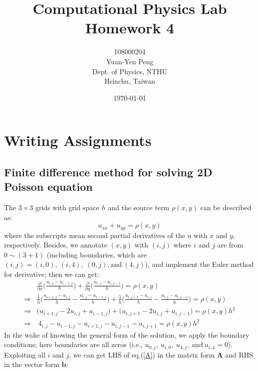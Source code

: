 \documentclass[12pt]{article}
\begin{document}
\title{\textbf{{\normalsize Computational Physics Lab}\\
                Homework 4}}
\author{108000204\\
        Yuan-Yen Peng\\
        Dept. of Physics, NTHU\\
        Hsinchu, Taiwan}
\date{\today}
\maketitle

\section{Writing Assignments}
    \subsection{Finite difference method for solving 2D Poisson equation}
    The $3 \times 3$ grids with grid space $h$ and the source term $\rho(x,y)$ can be described as:
    \[
        u_{xx} + u_{yy} = \rho(x,y)
    \]
    where the subscripts mean second partial derivatives of the u with $x$ and $y$, respectively. Besides, we annotate $(x,y)$ with $(i,j)$ where $i$ and $j$ are from $0 \sim (3+1)$ (including boundaries, which are $(i,j) = (i,0),\ (i,4),\ (0,j),\text{and}\ (4,j)$), and implement the Euler method for derivative; then we can get:
    \begin{align*}
        &\frac{\partial}{\partial x}\Big( \frac{u_{i,j} - u_{i-1,j}}{h} \Big) + \frac{\partial}{\partial y}\Big( \frac{u_{i,j} - u_{i,j-1}}{h} \Big) = \rho(x,y) \\
        \Rightarrow &\frac{1}{h} \Big( \frac{u_{i+1,j} - u_{i,j}}{h} - \frac{u_{i,j} - u_{i-1,j}}{h} \Big) + \frac{1}{h} \Big( \frac{u_{i,j+1} - u_{i,j}}{h} - \frac{u_{i,j} - u_{i,j-1}}{h} \Big) = \rho(x,y) \\
        \Rightarrow &\big( u_{i+1,j} - 2u_{i,j} + u_{i-1,j} \big) + \big( u_{i,j+1} - 2u_{i,j} + u_{i,j-1} \big) = \rho(x,y) h^{2} \\
        \Rightarrow&\ 4_{i,j} - u_{i-1,j} - u_{i+1,j} - u_{i,j-1} - u_{i,j+1} = \rho(x,y) h^{2} \tag{I}\label{A}
    \end{align*}
    In the wake of knowing the general form of the solution, we apply the boundary conditions; here boundaries are all zeros (i.e., $u_{0,j},\ u_{i,0},\ u_{4,j},\ \text{and}\ u_{i,4} = 0$). Exploiting all $i$ and $j$, we can get LHS of eq.(\ref{A}) in the matrix form $\mathbf{A}$ and RHS in the vector form $\mathbf{b}$:
\end{document}
